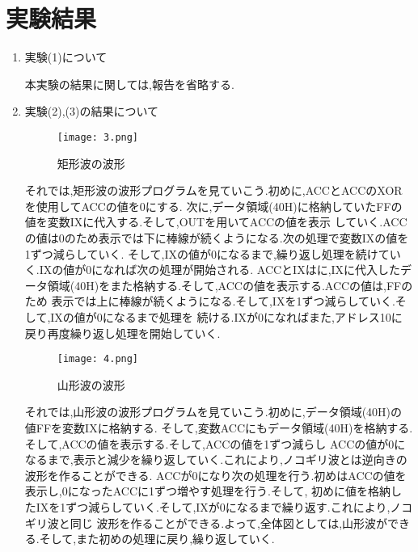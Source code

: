 \documentclass[a4paper,11pt,titlepage]{jarticle}
\begin{document}
\section{実験結果}
 \begin{enumerate}
  \item 実験(1)について
  \par
  本実験の結果に関しては,報告を省略する.
  \item 実験(2),(3)の結果について
  \par
  \begin{figure}[htbp]
\centering
\texttt{[image: 3.png]}
\label{矩形波の波形}\\
\caption{矩形波の波形}
  \end{figure}
  \clearpage
  
\par
      それでは,矩形波の波形プログラムを見ていこう.初めに,ACCとACCのXORを使用してACCの値を0にする.
    次に,データ領域(40H)に格納していたFFの値を変数IXに代入する.そして,OUTを用いてACCの値を表示
    していく.ACCの値は0のため表示では下に棒線が続くようになる.次の処理で変数IXの値を1ずつ減らしていく.
    そして,IXの値が0になるまで,繰り返し処理を続けていく.IXの値が0になれば次の処理が開始される.
    ACCとIXはに,IXに代入したデータ領域(40H)をまた格納する.そして,ACCの値を表示する.ACCの値は,FFのため
    表示では上に棒線が続くようになる.そして,IXを1ずつ減らしていく.そして,IXの値が0になるまで処理を
    続ける.IXが0になればまた,アドレス10に戻り再度繰り返し処理を開始していく.

  \begin{figure}[htbp]
  \centering
  \texttt{[image: 4.png]}
  \label{山形波の波形}\\
  \caption{山形波の波形}
  \end{figure}
  \clearpage
  
\par
      それでは,山形波の波形プログラムを見ていこう.初めに,データ領域(40H)の値FFを変数IXに格納する.
    そして,変数ACCにもデータ領域(40H)を格納する.そして,ACCの値を表示する.そして,ACCの値を1ずつ減らし
    ACCの値が0になるまで,表示と減少を繰り返していく.これにより,ノコギリ波とは逆向きの波形を作ることができる.
    ACCが0になり次の処理を行う.初めはACCの値を表示し,0になったACCに1ずつ増やす処理を行う.そして,
    初めに値を格納したIXを1ずつ減らしていく.そして,IXが0になるまで繰り返す.これにより,ノコギリ波と同じ
    波形を作ることができる.よって,全体図としては,山形波ができる.そして,また初めの処理に戻り,繰り返していく.
 \end{enumerate}
\end{document}
